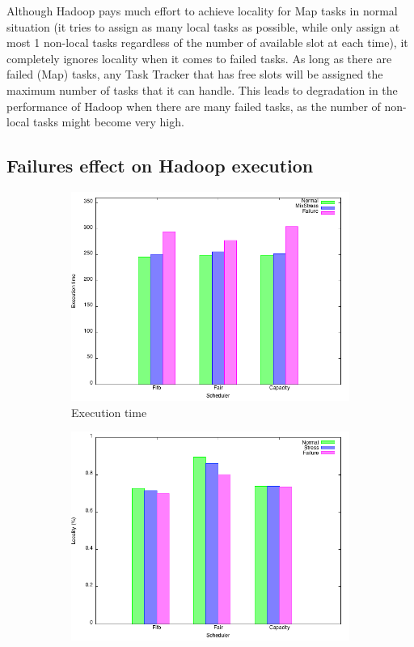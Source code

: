 \documentclass[runningheads,a4paper]{llncs}
\begin{document}
Although Hadoop pays much effort to achieve locality for Map tasks in normal situation (it tries to assign as many local tasks as possible, while only assign at most 1 non-local tasks regardless of the number of available slot at each time), it completely ignores locality when it comes to failed tasks. As long as there are failed (Map) tasks, any Task Tracker that has free slots will be assigned the maximum number of tasks that it can handle. This leads to degradation in the performance of Hadoop when there are many failed tasks, as the number of non-local tasks might become very high.

\subsection{Failures effect on Hadoop execution}
\begin{figure}
\centering
\begin{subfigure}{.5\textwidth}
  \centering
  \includegraphics[width=1\linewidth]{failure_long.png}
  \caption{Execution time}
  \label{fig:failure}
\end{subfigure}%
\begin{subfigure}{.5\textwidth}
  \centering
  \includegraphics[width=1\linewidth]{localWFailure_long.png}

\end{subfigure}
\end{figure}
\end{document}
